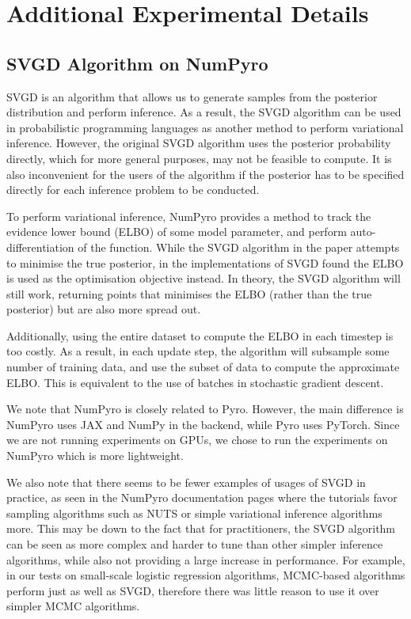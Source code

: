 \section{Additional Experimental Details}

\subsection{SVGD Algorithm on NumPyro}
\label{ssect:svgd-npy}

SVGD is an algorithm that allows us to generate samples from the posterior distribution and perform inference. As a result, the SVGD algorithm can be used in probabilistic programming languages as another method to perform variational inference. However, the original SVGD algorithm uses the posterior probability directly, which for more general purposes, may not be feasible to compute. It is also inconvenient for the users of the algorithm if the posterior has to be specified directly for each inference problem to be conducted.

To perform variational inference, NumPyro provides a method to track the evidence lower bound (ELBO) of some model parameter, and perform auto-differentiation of the function. While the SVGD algorithm in the paper attempts to minimise the true posterior, in the implementations of SVGD found the ELBO is used as the optimisation objective instead. In theory, the SVGD algorithm will still work, returning points that minimises the ELBO (rather than the true posterior) but are also more spread out. 

Additionally, using the entire dataset to compute the ELBO in each timestep is too costly. As a result, in each update step, the algorithm will subsample some number of training data, and use the subset of data to compute the approximate ELBO. This is equivalent to the use of batches in stochastic gradient descent.

We note that NumPyro is closely related to Pyro. However, the main difference is NumPyro uses JAX and NumPy in the backend, while Pyro uses PyTorch. Since we are not running experiments on GPUs, we chose to run the experiments on NumPyro which is more lightweight.

We also note that there seems to be fewer examples of usages of SVGD in practice, as seen in the NumPyro documentation pages where the tutorials favor sampling algorithms such as NUTS or simple variational inference algorithms more. This may be down to the fact that for practitioners, the SVGD algorithm can be seen as more complex and harder to tune than other simpler inference algorithms, while also not providing a large increase in performance. For example, in our tests on small-scale logistic regression algorithms, MCMC-based algorithms perform just as well as SVGD, therefore there was little reason to use it over simpler MCMC algorithms. 

